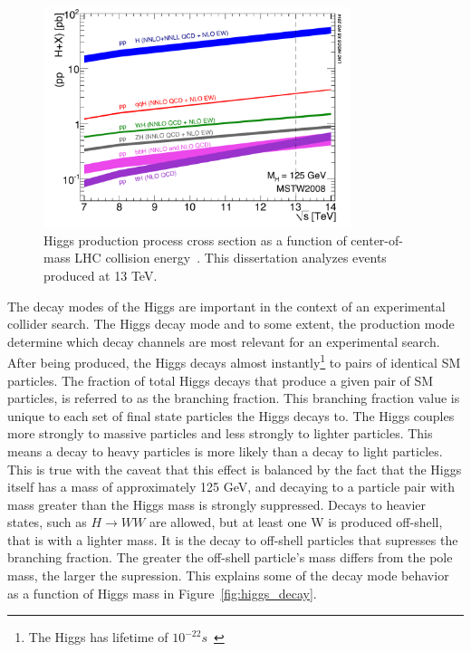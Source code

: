 \begin{figure}[hbtp]
 \begin{center}
   \includegraphics[width=0.8\textwidth]{ch2_figs/higgs_prod_xsec.pdf}
   \caption[Higgs production cross section vs LHC collision energy]{Higgs production process cross section as a function of center-of-mass LHC collision energy~\cite{lhchxswg}.
     This dissertation analyzes events produced at 13 TeV.}
   \label{fig:higgs_prod_plot}
 \end{center}
\end{figure}


The decay modes of the Higgs are important in the context of an experimental collider search. The Higgs decay mode and to some extent, the production mode
determine which decay channels are most relevant for an experimental search. After being produced, the Higgs decays almost instantly\footnote{
The Higgs has lifetime of $10^{-22}s$~\cite{pdg}} to pairs of identical SM particles. 
The fraction of total Higgs decays that produce a given pair of SM particles, is referred to as the branching fraction. This branching fraction value is unique
to each set of final state particles the Higgs decays to.
The Higgs couples more strongly to massive particles and less strongly to lighter particles. This means a decay to heavy
particles is more likely than a decay to light particles. This is true with the caveat that this effect is balanced by the fact that the Higgs itself has a
mass of approximately 125 GeV, and decaying to a particle pair with mass greater than the Higgs mass is strongly suppressed. Decays to heavier
states, such as $H\rightarrow WW$ are allowed, but at least one W is produced off-shell, that is with a lighter mass. It is the decay to off-shell
particles that supresses the branching fraction. The greater the off-shell particle's mass differs from the pole mass, the larger the supression.
This explains some of the decay mode behavior as a function of Higgs mass in
Figure~\ref{fig:higgs_decay}.

